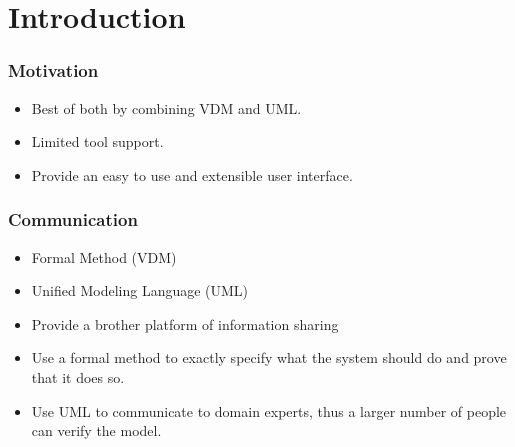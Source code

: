 %
%
\section{Introduction}
%
%
\frame
{
 \frametitle{Motivation}
  \begin{itemize}[<+->]
\itemsep=1cm
  \item<1-> Best of both by combining VDM and UML.
  \item<2-> Limited tool support.
  \item<3-> Provide an easy to use and extensible user interface.
  \end{itemize}
}

%
%
\frame
{
\frametitle{Communication}
  \begin{itemize}
	\itemsep=1cm
  		\item<1-> Formal Method (VDM)
  		\item<2-> Unified Modeling Language (UML)
  		\item<3-> Provide a brother platform of information sharing
  \end{itemize}

}

\note
{

  \begin{itemize}
  		\item Use a formal method to exactly specify what the system should do and prove that it does so.
  		\item Use UML to communicate to domain experts, thus a larger number of people can verify the model.
  		
  \end{itemize}



}

